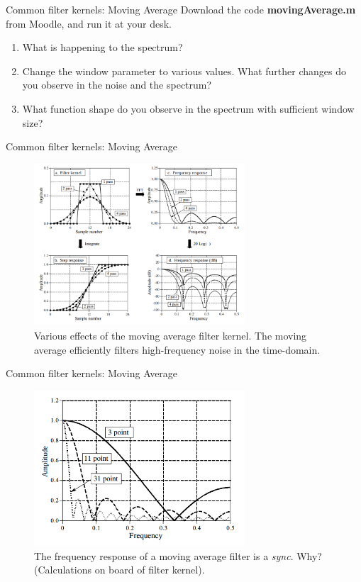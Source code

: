 \documentclass{beamer}
\begin{document}
\begin{frame}[fragile]{Common filter kernels: Moving Average}
Download the code \textbf{movingAverage.m} from Moodle, and run it at your desk.
\begin{enumerate}
\item What is happening to the spectrum?
\item Change the window parameter to various values.  What further changes do you observe in the noise and the spectrum?
\item What function shape do you observe in the spectrum with sufficient window size?
\end{enumerate}
\end{frame}

\begin{frame}{Common filter kernels: Moving Average}
\small
\begin{figure}
\centering
\includegraphics[width=0.7\textwidth]{figures/moving1.png}
\caption{\label{fig:moving1} Various effects of the moving average filter kernel. The moving average efficiently filters high-frequency noise in the time-domain.}
\end{figure}
\end{frame}

\begin{frame}{Common filter kernels: Moving Average}
\small
\begin{figure}
\centering
\includegraphics[width=0.7\textwidth]{figures/moving2.png}
\caption{\label{fig:moving2} The frequency response of a moving average filter is a \textit{sync}.  Why? (Calculations on board of filter kernel).}
\end{figure}
\end{frame}
\end{document}

